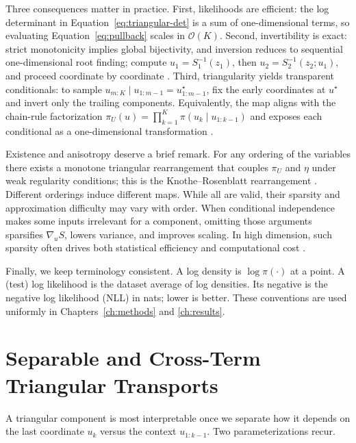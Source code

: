\documentclass[11pt,a4paper,twoside]{book}\usepackage[]{graphicx}\usepackage[]{xcolor}
\begin{document}
Three consequences matter in practice. First, likelihoods are efficient: the log determinant in Equation~\eqref{eq:triangular-det} is a sum of one-dimensional terms, so evaluating Equation~\eqref{eq:pullback} scales in $\mathcal{O}(K)$. Second, invertibility is exact: strict monotonicity implies global bijectivity, and inversion reduces to sequential one-dimensional root finding; compute $u_1=S_1^{-1}(z_1)$, then $u_2=S_2^{-1}(z_2;u_1)$, and proceed coordinate by coordinate \citep{rosenblatt1952remarks,knothe1957contributions}. Third, triangularity yields transparent conditionals: to sample $u_{m:K}\mid u_{1:m-1}=u^{\star}_{1:m-1}$, fix the early coordinates at $u^{\star}$ and invert only the trailing components. Equivalently, the map aligns with the chain-rule factorization $\pi_U(u)=\prod_{k=1}^K \pi(u_k\mid u_{1:k-1})$ and exposes each conditional as a one-dimensional transformation \citep{ramgraber2025friendly}.

Existence and anisotropy deserve a brief remark. For any ordering of the variables there exists a monotone triangular rearrangement that couples $\pi_U$ and $\eta$ under weak regularity conditions; this is the Knothe--Rosenblatt rearrangement \citep{rosenblatt1952remarks,knothe1957contributions}. Different orderings induce different maps. While all are valid, their sparsity and approximation difficulty may vary with order. When conditional independence makes some inputs irrelevant for a component, omitting those arguments sparsifies $\nabla_u S$, lowers variance, and improves scaling. In high dimension, such sparsity often drives both statistical efficiency and computational cost \citep{ramgraber2025friendly}.

Finally, we keep terminology consistent. A log density is $\log \hat\pi(\cdot)$ at a point. A (test) log likelihood is the dataset average of log densities. Its negative is the negative log likelihood (NLL) in nats; lower is better. These conventions are used uniformly in Chapters~\ref{ch:methods} and \ref{ch:results}.

\section{Separable and Cross-Term Triangular Transports}

A triangular component is most interpretable once we separate how it depends on the last coordinate $u_k$ versus the context $u_{1:k-1}$. Two parameterizations recur.
\end{document}
